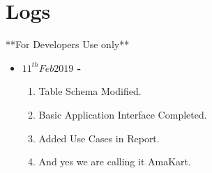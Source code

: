\documentclass[a4paper,12pt]{article}
\begin{document}
\section{Logs}
\begin{center}
    **For Developers Use only**
\end{center}
\begin{itemize}
    \item \textbf{$11^{th}Feb2019$ - } \begin{enumerate}
                                          \item Table Schema Modified.
                                          \item Basic Application Interface Completed.
                                          \item Added Use Cases in Report.
                                          \item And yes we are calling it AmaKart.
                                       \end{enumerate}
\end{itemize}
\end{document}
